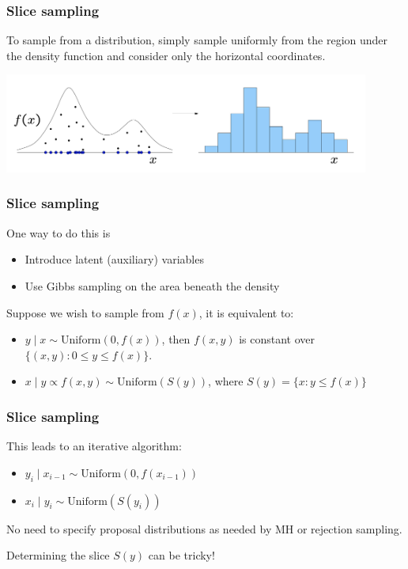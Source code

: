 \documentclass{beamer}
\begin{document}
\begin{frame}
  \frametitle{Slice sampling}
To sample from a distribution, simply sample uniformly from the
region under the density function and consider only the horizontal
coordinates.
\begin{center}
\includegraphics[width=120mm]{slice_sampling}
\end{center}
\end{frame}



\begin{frame}
  \frametitle{Slice sampling}
One way to do this is
\begin{itemize}
\item Introduce latent (auxiliary) variables
\item Use Gibbs sampling on the area beneath the density
\end{itemize}
\vspace{0.2cm}

Suppose we wish to sample from $f(x)$, it is equivalent to:
\begin{itemize}
\item $y \mid x \sim \mbox{Uniform}(0, f(x))$, then $f(x,y)$ is
  constant over $\{(x,y): 0 \leq y \leq f(x)\}$.
\item $x \mid y \propto f(x,y) \sim \mbox{Uniform}(S(y))$, where $S(y)
  = \{x: y \leq f(x)\}$  
\end{itemize}
\end{frame}


\begin{frame}
  \frametitle{Slice sampling}
  This leads to an iterative algorithm:
  \begin{itemize}
  \item $y_i \mid x_{i-1} \sim \mbox{Uniform}(0, f(x_{i-1}))$
  \item $x_i \mid y_i \sim \mbox{Uniform}(S(y_i))$
  \end{itemize}
\vspace{0.2cm}

No need to specify proposal distributions as needed by MH or rejection sampling. 
\vspace{0.2cm}

Determining the slice $S(y)$ can be tricky!
\end{frame}
\end{document}
